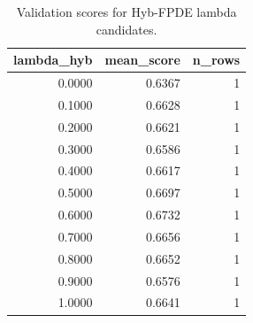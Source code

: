 \begin{table}[t]
\caption{Validation scores for Hyb-FPDE lambda candidates.}
\label{tab:lambda_distribution_computed}
\centering
\begin{tabular}{rrr}
\toprule
lambda\_hyb & mean\_score & n\_rows \\
\midrule
0.0000 & 0.6367 & 1 \\
0.1000 & 0.6628 & 1 \\
0.2000 & 0.6621 & 1 \\
0.3000 & 0.6586 & 1 \\
0.4000 & 0.6617 & 1 \\
0.5000 & 0.6697 & 1 \\
0.6000 & 0.6732 & 1 \\
0.7000 & 0.6656 & 1 \\
0.8000 & 0.6652 & 1 \\
0.9000 & 0.6576 & 1 \\
1.0000 & 0.6641 & 1 \\
\bottomrule
\end{tabular}

\end{table}
